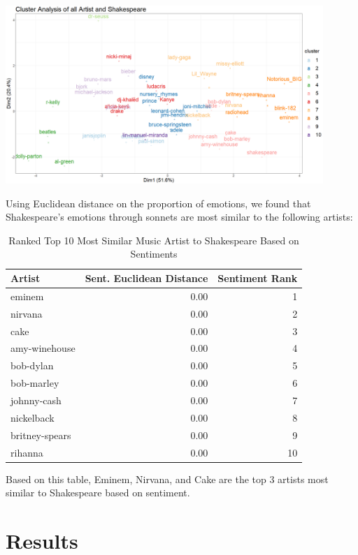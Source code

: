 \documentclass[10pt,a4paper]{article}
\begin{document}
\begin{center}
\includegraphics[width=12cm]{_assets/ClusterAnalysis_Fit10.png}
\end{center}

Using Euclidean distance on the proportion of emotions, we found that Shakespeare's emotions through sonnets are most similar to the following artists:

\begin{table}[ht]
\centering
\begin{tabular}{lrr}
  \hline
Artist & Sent. Euclidean Distance & Sentiment Rank \\ 
  \hline
eminem & 0.00 &   1 \\ 
  nirvana & 0.00 &   2 \\ 
  cake & 0.00 &   3 \\ 
  amy-winehouse & 0.00 &   4 \\ 
  bob-dylan & 0.00 &   5 \\ 
  bob-marley & 0.00 &   6 \\ 
  johnny-cash & 0.00 &   7 \\ 
  nickelback & 0.00 &   8 \\ 
  britney-spears & 0.00 &   9 \\ 
  rihanna & 0.00 &  10 \\ 
   \hline
\end{tabular}%
\caption{Ranked Top 10 Most Similar Music Artist to Shakespeare Based on Sentiments} 
\label{tab:wordranktable}
\end{table}

Based on this table, Eminem, Nirvana, and Cake are the top 3 artists most similar to Shakespeare based on sentiment.

\section{Results}
\end{document}
